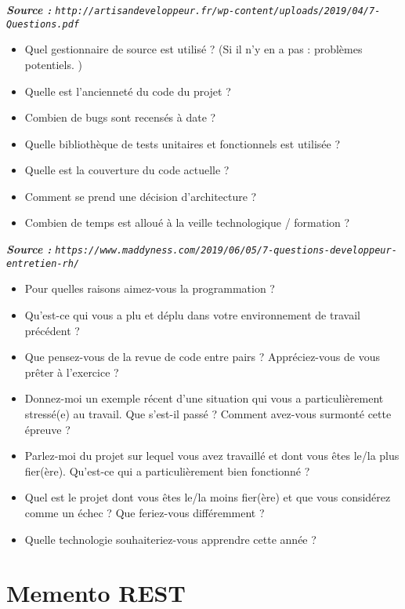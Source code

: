 \documentclass[11pt,twoside,a4paper]{article}
\begin{document}
\begin{landscape}
\begin{multicols}{2}
	\emph{\footnotesize \textbf{Source : } \texttt{http://artisandeveloppeur.fr/wp-content/uploads/2019/04/7-Questions.pdf} }
	\begin{itemize}
		\item Quel gestionnaire de source est utilis{\'e} ? (Si il n'y en a pas : probl{\`e}mes potentiels. )
		\item Quelle est l'anciennet{\'e} du code du projet ?
		\item Combien de bugs sont recens{\'e}s {\`a} date ?
		\item Quelle biblioth{\`e}que de tests unitaires et fonctionnels est utilis{\'e}e ?
		\item Quelle est la couverture du code actuelle ?
		\item Comment se prend une d{\'e}cision d'architecture ?
		\item Combien de temps est allou{\'e} {\`a} la veille technologique / formation ?
	\end{itemize}
	
	\emph{\footnotesize \textbf{Source : } \texttt{https://www.maddyness.com/2019/06/05/7-questions-developpeur-entretien-rh/} }
	\begin{itemize}
		\item Pour quelles raisons aimez-vous la programmation ?
		\item Qu'est-ce qui vous a plu et d{\'e}plu dans votre environnement de travail pr{\'e}c{\'e}dent ?
		\item Que pensez-vous de la revue de code entre pairs ? Appr{\'e}ciez-vous de vous pr{\^e}ter {\`a} l'exercice ?
		\item Donnez-moi un exemple r{\'e}cent d'une situation qui vous a particuli{\`e}rement stress{\'e}(e) au travail. Que s'est-il pass{\'e} ? Comment avez-vous surmont{\'e} cette {\'e}preuve ?
		\item Parlez-moi du projet sur lequel vous avez travaill{\'e} et dont vous {\^e}tes le/la plus fier({\`e}re). Qu'est-ce qui a particuli{\`e}rement bien fonctionn{\'e} ?
		\item Quel est le projet dont vous {\^e}tes le/la moins fier({\`e}re) et que vous consid{\'e}rez comme un {\'e}chec ? Que feriez-vous diff{\'e}remment ?
		\item Quelle technologie souhaiteriez-vous apprendre cette ann{\'e}e ?
	\end{itemize}
	
	\vfill
	\columnbreak
	
	\section*{Memento REST}
	

\end{multicols}
\end{landscape}
\end{document}
